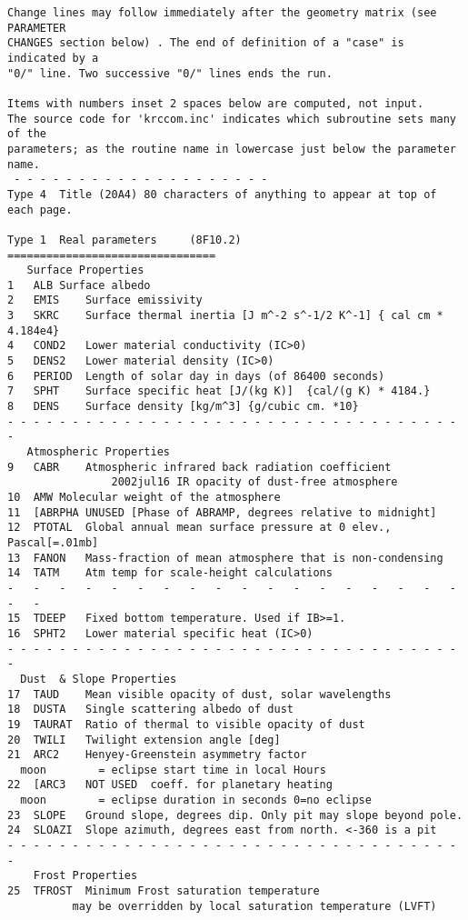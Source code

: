 \begin{verbatim}
Change lines may follow immediately after the geometry matrix (see PARAMETER
CHANGES section below) . The end of definition of a "case" is indicated by a
"0/" line. Two successive "0/" lines ends the run.

Items with numbers inset 2 spaces below are computed, not input.                
The source code for 'krccom.inc' indicates which subroutine sets many of the 
parameters; as the routine name in lowercase just below the parameter name.
 - - - - - - - - - - - - - - - - - - - -
Type 4	Title (20A4) 80 characters of anything to appear at top of each page.

Type 1	Real parameters 	(8F10.2)	================================
   Surface Properties
1	ALB	Surface albedo
2	EMIS	Surface emissivity
3	SKRC	Surface thermal inertia [J m^-2 s^-1/2 K^-1] { cal cm * 4.184e4}
4	COND2	Lower material conductivity (IC>0)
5	DENS2	Lower material density (IC>0)
6	PERIOD	Length of solar day in days (of 86400 seconds)
7	SPHT	Surface specific heat [J/(kg K)]  {cal/(g K) * 4184.}
8	DENS	Surface density [kg/m^3] {g/cubic cm. *10}
- - - - - - - - - - - - - - - - - - - - - - - - - - - - - - - - - - - - 
   Atmospheric Properties
9	CABR	Atmospheric infrared back radiation coefficient
                2002jul16 IR opacity of dust-free atmosphere
10	AMW	Molecular weight of the atmosphere
11	[ABRPHA	UNUSED [Phase of ABRAMP, degrees relative to midnight] 
12	PTOTAL	Global annual mean surface pressure at 0 elev., Pascal[=.01mb]
13	FANON	Mass-fraction of mean atmosphere that is non-condensing
14	TATM	Atm temp for scale-height calculations
-   -   -   -   -   -   -   -   -   -   -   -   -   -   -   -   -   -   -   -   
15	TDEEP	Fixed bottom temperature. Used if IB>=1.
16	SPHT2	Lower material specific heat (IC>0)
- - - - - - - - - - - - - - - - - - - - - - - - - - - - - - - - - - - - 
  Dust  & Slope Properties
17	TAUD	Mean visible opacity of dust, solar wavelengths
18	DUSTA	Single scattering albedo of dust
19	TAURAT	Ratio of thermal to visible opacity of dust
20	TWILI	Twilight extension angle [deg]
21	ARC2	Henyey-Greenstein asymmetry factor
  moon        = eclipse start time in local Hours
22	[ARC3	NOT USED  coeff. for planetary heating 
  moon        = eclipse duration in seconds 0=no eclipse
23	SLOPE	Ground slope, degrees dip. Only pit may slope beyond pole.
24	SLOAZI	Slope azimuth, degrees east from north. <-360 is a pit
- - - - - - - - - - - - - - - - - - - - - - - - - - - - - - - - - - - - 
    Frost Properties
25	TFROST	Minimum Frost saturation temperature
		  may be overridden by local saturation temperature (LVFT)

\end{verbatim}
